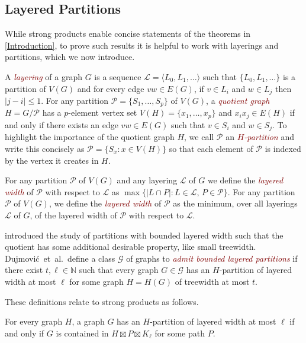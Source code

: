 \documentclass{patmorin}
\newcommand{\defin}[1]{\textcolor{Maroon}{\emph{#1}}}
\newcommand{\PP}{\mathcal{P}}
\renewcommand{\leq}{\leqslant}
\begin{document}
\subsection{Layered Partitions}
\label{LayeredPartitions}

While strong products enable concise statements of the theorems in \cref{Introduction}, to prove such results it is helpful to work with layerings and partitions, which we now introduce.

A \defin{layering} of a graph $G$ is a sequence $\mathcal{L}=\langle L_0,L_1,\ldots\rangle$ such that $\{L_0,L_1,\ldots\}$ is a partition of $V(G)$ and for every edge $vw\in E(G)$, if $v\in L_i$ and $w\in L_j$ then $|j-i|\leq 1$.  For any partition $\PP=\{S_1,\ldots,S_p\}$ of $V(G)$, a \defin{quotient graph} $H=G/\PP$ has a $p$-element vertex set $V(H)=\{x_1,\ldots,x_p\}$ and $x_ix_j\in E(H)$ if and only if there exists an edge $vw\in E(G)$ such that $v\in S_i$ and $w\in S_j$. To highlight the importance of the quotient graph $H$, we call $\PP$ an \defin{$H$-partition} and write this concisely as $\PP=\{S_x : x\in V(H)\}$ so that each element of $\PP$ is indexed by the vertex it creates in $H$.

For any partition $\PP$ of $V(G)$ and any layering $\mathcal{L}$ of $G$ we define the \defin{layered width} of $\PP$ with respect to $\mathcal{L}$ as $\max\{|L\cap P|: L\in\mathcal{L},\, P\in\PP\}$.  For any partition $\PP$ of $V(G)$, we define the \defin{layered width} of $\PP$ as the minimum, over all layerings $\mathcal{L}$ of $G$, of the layered width of $\PP$ with respect to $\mathcal{L}$.

\citet{DJMMUW20} introduced the study of partitions with bounded layered width such that the quotient has some additional desirable property, like small treewidth. Dujmovi\'c~et~al.\ define a class $\mathcal{G}$ of graphs to \defin{admit bounded layered partitions} if there exist $t,\ell\in\mathbb{N}$ such that every graph $G\in \mathcal{G}$ has an $H$-partition of layered width at most $\ell$ for some graph $H=H(G)$ of treewidth at most $t$.

These definitions relate to strong products as follows.

\begin{lem}
\label{PartitionProduct}
For every graph $H$, a graph $G$ has an $H$-partition of layered width at most $\ell$ if and only if $G$ is contained in $H \boxtimes P \boxtimes K_\ell$ for some path $P$.
\end{lem}
\end{document}
